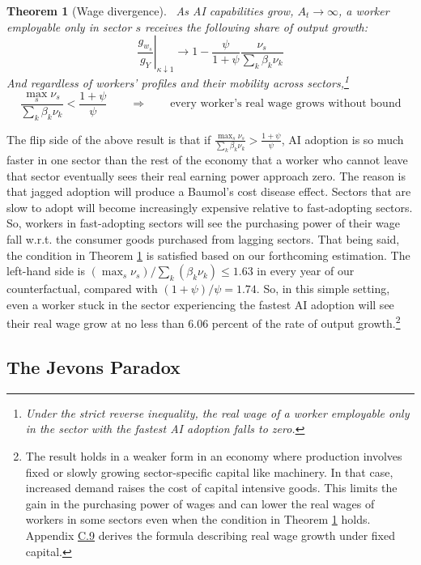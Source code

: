 \documentclass[11pt]{article}
\newtheorem{sectiontheorem}[theorem]{Theorem}
\begin{document}
\begin{sectiontheorem}[Wage divergence]\label{thm:wage-divergence}
~As AI capabilities grow, $A_{t}\to\infty$, a worker employable only
in sector $s$ receives the following share of output growth:
\[
\left.\frac{g_{w_{s}}}{g_{Y}}\right|_{\kappa\downarrow1}\longrightarrow1-\frac{\psi}{1+\psi}\frac{\nu_{s}}{\sum_{k}\beta_{k}\nu_{k}}
\]
 And regardless of workers' profiles and their mobility across sectors,\footnote{Under the strict reverse inequality, the real wage of a worker employable
only in the sector with the fastest AI adoption falls to zero.}
\[
\frac{\max_{s}\nu_{s}}{\sum_{k}\beta_{k}\nu_{k}}<\frac{1+\psi}{\psi}\qquad\Longrightarrow\qquad\text{every worker's real wage grows without bound}
\]
\end{sectiontheorem}

The flip side of the above result is that if $\frac{\max_{s}\nu_{s}}{\sum_{k}\beta_{k}\nu_{k}}>\frac{1+\psi}{\psi}$,
AI adoption is so much faster in one sector than the rest of the economy
that a worker who cannot leave that sector eventually sees their real
earning power approach zero. The reason is that jagged adoption will
produce a Baumol's cost disease effect. Sectors that are slow to adopt
will become increasingly expensive relative to fast-adopting sectors.
So, workers in fast-adopting sectors will see the purchasing power
of their wage fall w.r.t. the consumer goods purchased from lagging
sectors. That being said, the condition in Theorem \ref{thm:wage-divergence}
is satisfied based on our forthcoming estimation. The left-hand side
is $(\max_{s}\nu_{s})/\sum_{k}(\beta_{k}\nu_{k})\leq1.63$
in every year of our counterfactual, compared with $(1+\psi)/\psi=1.74$.
So, in this simple setting, even a worker stuck in the sector experiencing
the fastest AI adoption will see their real wage grow at no less than
$6.06$ percent of the rate of output
growth.\footnote{The result holds in a weaker form in an economy where production involves
fixed or slowly growing sector-specific capital like machinery. In
that case, increased demand raises the cost of capital intensive goods.
This limits the gain in the purchasing power of wages and can lower
the real wages of workers in some sectors even when the condition
in Theorem \ref{thm:wage-divergence} holds. Appendix \href{https://ahmadlp.github.io/Lashkaripour_AI_Displacement_Online_Appendix.pdf\#page=91}{C.9}
derives the formula describing real wage growth under fixed capital.}

\subsection{The Jevons Paradox}\label{sec:jevons}
\end{document}
